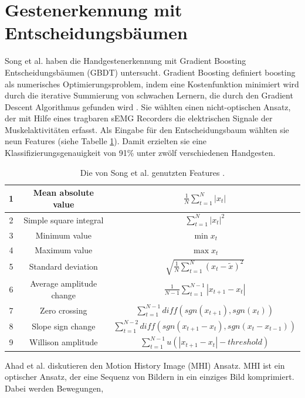 \section{Gestenerkennung mit Entscheidungsbäumen}
\label{sec:sota_misc}
Song et al. \cite{song2019design} haben die Handgestenerkennung mit Gradient Boosting Entscheidungsbäumen (GBDT) untersucht. Gradient Boosting definiert boosting als numerisches Optimierungsproblem,
indem eine Kostenfunktion minimiert wird durch die iterative Summierung von schwachen Lernern, die durch den Gradient Descent Algorithmus gefunden wird \cite{friedman1999greedy}. Sie wählten einen nicht-optischen
Ansatz, der mit Hilfe eines tragbaren sEMG Recorders die elektrischen Signale der Muskelaktivitäten erfasst. Als Eingabe für den Entscheidungsbaum wählten sie neun Features (siehe Tabelle \ref{tab:songFeatures}).
Damit erzielten sie eine Klassifizierungsgenauigkeit von 91\% unter zwölf verschiedenen Handgesten.
\begin{table}[h!]
    \centering
    \begin{tabular}{ | c | c | c | }
        \hline
        1 & Mean absolute value & $\frac{1}{N}\sum^N_{t=1} |x_t|$ \\\hline
        2 & Simple square integral & $\sum^N_{t=1} |x_t|^2$ \\\hline
        3 & Minimum value & $\min x_t$ \\\hline
        4 & Maximum value & $\max x_t$ \\\hline
        5 & Standard deviation & $\sqrt{\frac{1}{N}\sum^N_{t=1}(x_t - \tilde{x})^2}$ \\\hline
        6 & Average amplitude change & $\frac{1}{N-1}\sum^{N-1}_{t=1} |x_{t + 1} - x_t|$ \\\hline
        7 & Zero crossing & $\sum^{N-1}_{t=1}diff(sgn(x_{t+1}),sgn(x_t))$ \\\hline
        8 & Slope sign change & $\sum^{N-2}_{t=1}diff(sgn(x_{t+1} - x_t),sgn(x_t - x_{t - 1}))$ \\\hline
        9 & Willison amplitude & $\sum^{N-1}_{t=1}u(|x_{t+1} - x_t| - threshold)$ \\
        \hline
    \end{tabular}
    \caption{Die von Song et al. genutzten Features \cite{song2019design}.}
    \label{tab:songFeatures}
\end{table}
\newline
\newline
Ahad et al. \cite{ahad2012motion} diskutieren den Motion History Image (MHI) Ansatz. MHI ist ein optischer Ansatz, der eine Sequenz von Bildern in ein einziges Bild komprimiert. Dabei werden Bewegungen,
